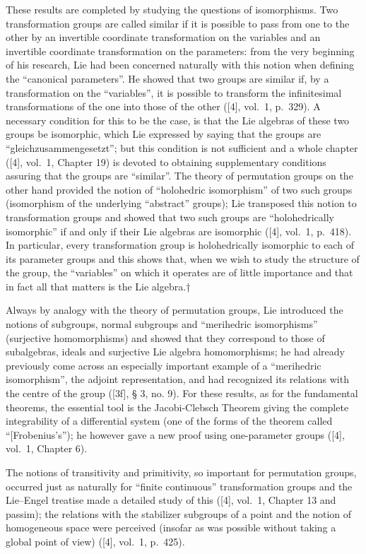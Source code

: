 These results are completed by studying the questions of isomorphisms. Two transformation groups are called similar if it is possible to pass from one to the other by an invertible coordinate transformation on the variables and an invertible coordinate transformation on the parameters: from the very beginning of his research, Lie had been concerned naturally with this notion when defining the ``canonical parameters''. He showed that two groups are similar if, by a transformation on the ``variables'', it is possible to transform the infinitesimal transformations of the one into those of the other ({[}4{]}, vol.~1, p.~329). A necessary condition for this to be the case, is that the Lie algebras of these two groups be isomorphic, which Lie expressed by saying that the groups are ``gleichzusammengesetzt''; but this condition is not sufficient and a whole chapter ({[}4{]}, vol.~1, Chapter 19) is devoted to obtaining supplementary conditions assuring that the groups are ``similar''. The theory of permutation groups on the other hand provided the notion of ``holohedric isomorphism'' of two such groups (isomorphism of the underlying ``abstract'' groups); Lie transposed this notion to transformation groups and showed that two such groups are ``holohedrically isomorphic'' if and only if their Lie algebras are isomorphic ({[}4{]}, vol.~1, p.~418). In particular, every transformation group is holohedrically isomorphic to each of its parameter groups and this shows that, when we wish to study the structure of the group, the ``variables'' on which it operates are of little importance and that in fact all that matters is the Lie algebra.†

Always by analogy with the theory of permutation groups, Lie introduced the notions of subgroups, normal subgroups and ``merihedric isomorphisms'' (surjective homomorphisms) and showed that they correspond to those of subalgebras, ideals and surjective Lie algebra homomorphisms; he had already previously come across an especially important example of a ``merihedric isomorphism'', the adjoint representation, and had recognized its relations with the centre of the group ({[}3f{]}, § 3, no. 9). For these results, as for the fundamental theorems, the essential tool is the Jacobi-Clebsch Theorem giving the complete integrability of a differential system (one of the forms of the theorem called ``{[}Frobenius's''); he however gave a new proof using one-parameter groups ({[}4{]}, vol.~1, Chapter 6).

The notions of transitivity and primitivity, so important for permutation groups, occurred just as naturally for ``finite continuous'' transformation groups and the Lie--Engel treatise made a detailed study of this ({[}4{]}, vol.~1, Chapter 13 and passim); the relations with the stabilizer subgroups of a point and the notion of homogeneous space were perceived (insofar as was possible without taking a global point of view) ({[}4{]}, vol.~1, p.~425).

